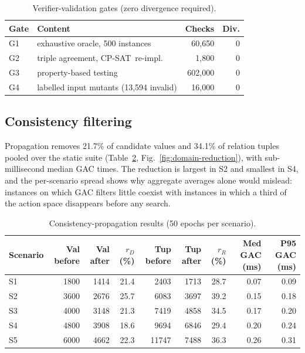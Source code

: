 \documentclass[pdflatex,sn-mathphys-num,iicol,oneside]{sn-jnl}
\newcommand{\cpsat}{\textsc{CP-SAT}}
\begin{document}
\begin{table}[t]
\centering
\caption{Verifier-validation gates (zero divergence required).}
\label{tab:gates}
\setlength{\tabcolsep}{2pt}\footnotesize
\begin{tabular}{llrr}
\toprule
Gate & Content & Checks & Div.\\
\midrule
G1 & exhaustive oracle, 500 instances & 60{,}650 & 0\\
G2 & triple agreement, \cpsat\ re-impl. & 1{,}800 & 0\\
G3 & property-based testing & 602{,}000 & 0\\
G4 & labelled input mutants (13{,}594 invalid) & 16{,}000 & 0\\
\bottomrule
\end{tabular}
\normalsize
\end{table}

\subsection{Consistency filtering}

Propagation removes 21.7\% of candidate values and 34.1\% of relation
tuples pooled over the static suite (Table~\ref{tab:propagation-results},
Fig.~\ref{fig:domain-reduction}), with sub-millisecond median GAC
times. The reduction is largest in S2 and smallest in S4, and the
per-scenario spread shows why aggregate averages alone would mislead:
instances on which GAC filters little coexist with instances in which
a third of the action space disappears before any search.

\begin{table}[t]
\centering
\caption{Consistency-propagation results (50 epochs per scenario).}
\label{tab:propagation-results}
\setlength{\tabcolsep}{4pt}\small
\begin{tabular}{lrrrrrrrr}
\toprule
Scenario & Val before & Val after & $r_D$ (\%) & Tup before &
Tup after & $r_R$ (\%) & Med GAC (ms) & P95 GAC (ms)\\
\midrule
S1 & 1800 & 1414 & 21.4 & 2403 & 1713 & 28.7 & 0.07 & 0.09\\
S2 & 3600 & 2676 & 25.7 & 6083 & 3697 & 39.2 & 0.15 & 0.18\\
S3 & 4000 & 3148 & 21.3 & 7419 & 4858 & 34.5 & 0.17 & 0.20\\
S4 & 4800 & 3908 & 18.6 & 9694 & 6846 & 29.4 & 0.20 & 0.24\\
S5 & 6000 & 4662 & 22.3 & 11747 & 7488 & 36.3 & 0.26 & 0.31\\
\bottomrule
\end{tabular}
\normalsize
\end{table}
\end{document}
